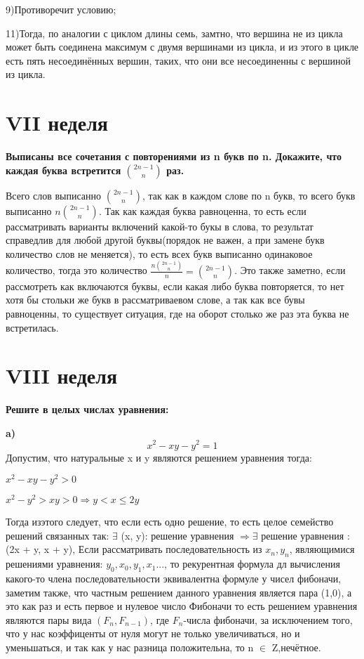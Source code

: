 \documentclass[a4paper,11pt]{article}
\begin{document}
 9)Противоречит условию;
 
 11)Тогда, по аналогии с циклом длины семь, замтно, что вершина не из цикла может быть соединена максимум с двумя вершинами из цикла, и из этого в цикле есть пять несоединённых вершин, таких, что они все несоединенны с вершиной из цикла.


 
 \section*{VII неделя}
 \textbf{Выписаны все сочетания с повторениями из n букв по n. Докажите, что каждая буква встретится ${2n - 1 \choose n}$ раз.}
  
  Всего слов выписанно ${2n - 1 \choose n}$, так как в каждом слове по n букв, то всего букв выписанно $n{2n - 1 \choose n}$. Так как каждая буква равноценна, то есть если рассматривать варианты включений какой-то букы в слова, то результат справедлив для любой другой буквы(порядок не важен, а при замене букв количество слов не меняется), то есть всех букв выписанно одинаковое количество, тогда это количество $\frac{n{2n - 1 \choose n}}{n} = {2n - 1 \choose n}$. Это также заметно, если рассмотреть как включаются буквы, если какая либо буква повторяется, то нет хотя бы стольки же букв в рассматриваевом слове, а так как все бувы равноценны, то существует ситуация, где на оборот столько же раз эта буква не встретилась.
  
 

 \section*{VIII неделя}
  \textbf{Решите в целых числах уравнения:}
  
  
  \textbf{a)} \[x^2 - xy - y^2 = 1\]
  Допустим, что натуральные x и y являются решением уравнения тогда:
  
  $ x^2 - xy - y^2 > 0 $
  
  $ x^2  - y^2 > xy > 0  \Rightarrow y < x \leq 2y$
  
  Тогда изэтого следует, что если есть одно решение, то есть целое семейство решений связанных так: $\exists$ (x, y): решение уравнения $\Rightarrow \exists$ решение уравнения :(2x + y, x + y), Если рассматривать последовательность из $x_n, y_n$,  являющимися решениями уравнения:
  $y_0, x_0, y_1, x_1 ...$, то рекурентная формула дл вычисления какого-то члена последовательности эквивалентна формуле у чисел фибоначи,
  заметим также, что частным решением данного уравнения является пара (1,0), а это как раз и есть первое и нулевое число Фибоначи то есть решением уравнения являются пары вида $(F_n, F_{n-1})$, где $F_n$-числа фибоначи, за исключением того, что у нас коэффиценты от нуля могут не только увеличиваться, но и уменьшаться, и так как у нас разница положительна, то n $\in$ Z,нечётное.
\end{document}
